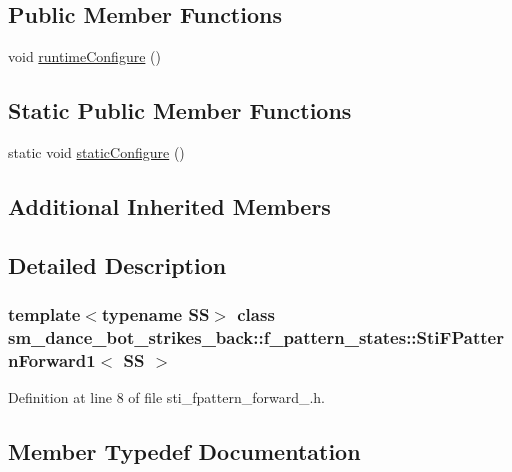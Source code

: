 \subsection*{Public Member Functions}
\begin{DoxyCompactItemize}
\item 
void \hyperlink{structsm__dance__bot__strikes__back_1_1f__pattern__states_1_1StiFPatternForward1_ae0e8a1296eb9d7be70833fa4a7783042}{runtime\+Configure} ()
\end{DoxyCompactItemize}
\subsection*{Static Public Member Functions}
\begin{DoxyCompactItemize}
\item 
static void \hyperlink{structsm__dance__bot__strikes__back_1_1f__pattern__states_1_1StiFPatternForward1_a49f96e0183e05bf9c7ae44535bb2f2fb}{static\+Configure} ()
\end{DoxyCompactItemize}
\subsection*{Additional Inherited Members}


\subsection{Detailed Description}
\subsubsection*{template$<$typename SS$>$\newline
class sm\+\_\+dance\+\_\+bot\+\_\+strikes\+\_\+back\+::f\+\_\+pattern\+\_\+states\+::\+Sti\+F\+Pattern\+Forward1$<$ S\+S $>$}



Definition at line 8 of file sti\+\_\+fpattern\+\_\+forward\+\_.\+h.



\subsection{Member Typedef Documentation}
\mbox{\label{structsm__dance__bot__strikes__back_1_1f__pattern__states_1_1StiFPatternForward1_a15622eba77548660934a40ec88591a4f}} 
